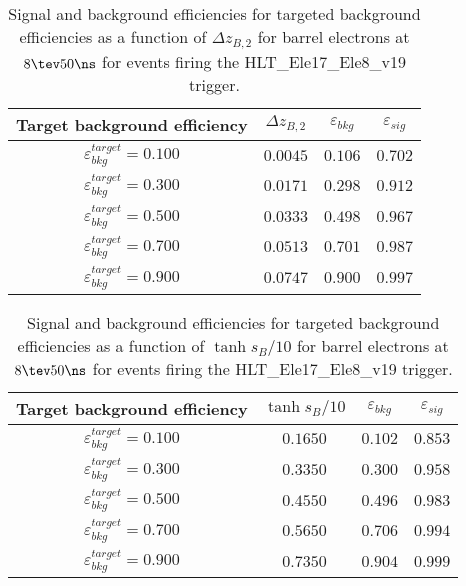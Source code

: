 \clearpage

\begin{table}[!bht]
  \begin{center}
    \begin{tabular}{cccc}
      \hline
      Target background efficiency & $\Delta z_{B,2}$ & $\varepsilon_{bkg}$ & $\varepsilon_{sig}$ \\ 
      \hline
      $\varepsilon_{bkg}^{target} = 0.100$ & $  0.0045$ & $0.106$ & $0.702$ \\
      $\varepsilon_{bkg}^{target} = 0.300$ & $  0.0171$ & $0.298$ & $0.912$ \\
      $\varepsilon_{bkg}^{target} = 0.500$ & $  0.0333$ & $0.498$ & $0.967$ \\
      $\varepsilon_{bkg}^{target} = 0.700$ & $  0.0513$ & $0.701$ & $0.987$ \\
      $\varepsilon_{bkg}^{target} = 0.900$ & $  0.0747$ & $0.900$ & $0.997$ \\
      \hline
    \end{tabular}
    \caption{Signal and background efficiencies for targeted background efficiencies as a function of $\Delta z_{B,2}$ for barrel electrons at $8\tev 50\ns$ for events firing the HLT\_Ele17\_Ele8\_v19 trigger.}
    \label{tab:eff_rej_z2B_beam_8_50_trigger_17_8_B}
  \end{center}
\end{table}

\clearpage

\begin{table}[!bht]
  \begin{center}
    \begin{tabular}{cccc}
      \hline
      Target background efficiency & $\tanh{s_B/10}$ & $\varepsilon_{bkg}$ & $\varepsilon_{sig}$ \\ 
      \hline
      $\varepsilon_{bkg}^{target} = 0.100$ & $  0.1650$ & $0.102$ & $0.853$ \\
      $\varepsilon_{bkg}^{target} = 0.300$ & $  0.3350$ & $0.300$ & $0.958$ \\
      $\varepsilon_{bkg}^{target} = 0.500$ & $  0.4550$ & $0.496$ & $0.983$ \\
      $\varepsilon_{bkg}^{target} = 0.700$ & $  0.5650$ & $0.706$ & $0.994$ \\
      $\varepsilon_{bkg}^{target} = 0.900$ & $  0.7350$ & $0.904$ & $0.999$ \\
      \hline
    \end{tabular}
    \caption{Signal and background efficiencies for targeted background efficiencies as a function of $\tanh{s_B/10}$ for barrel electrons at $8\tev 50\ns$ for events firing the HLT\_Ele17\_Ele8\_v19 trigger.}
    \label{tab:eff_rej_sB_beam_8_50_trigger_17_8_B}
  \end{center}
\end{table}

